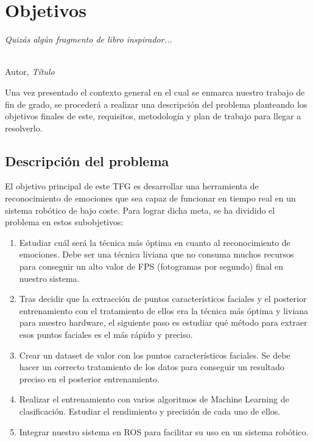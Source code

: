 \chapter{Objetivos}
\label{cap:capitulo2}

\begin{flushright}
\begin{minipage}[]{10cm}
\emph{Quizás algún fragmento de libro inspirador...}\\
\end{minipage}\\

Autor, \textit{Título}\\
\end{flushright}

\vspace{1cm}

Una vez presentado el contexto general en el cual se enmarca nuestro trabajo de fin de grado, se procederá a realizar una descripción del problema planteando los objetivos finales de este, requisitos, metodología y plan de trabajo para llegar a resolverlo.

\section{Descripción del problema}
\label{sec:descripcion}

El objetivo principal de este TFG es desarrollar una herramienta de reconocimiento de emociones que sea capaz de funcionar en tiempo real en un sistema robótico de bajo coste. Para lograr dicha meta, se ha dividido el problema en estos subobjetivos:
\begin{enumerate}
    \item Estudiar cuál será la técnica más óptima en cuanto al reconocimiento de emociones. Debe ser una técnica liviana que no consuma muchos recursos para conseguir un alto valor de FPS (fotogramas por segundo) final en nuestro sistema.
    
    \item Tras decidir que la extracción de puntos característicos faciales y el posterior entrenamiento con el tratamiento de ellos era la técnica más óptima y liviana para nuestro hardware, el siguiente paso es estudiar qué método para extraer esos puntos faciales es el más rápido y preciso.
    
    \item Crear un dataset de valor con los puntos característicos faciales. Se debe hacer un correcto tratamiento de los datos para conseguir un resultado preciso en el posterior entrenamiento.
    
    \item Realizar el entrenamiento con varios algoritmos de Machine Learning de clasificación. Estudiar el rendimiento y precisión de cada uno de ellos.
    
    \item Integrar nuestro sistema en ROS para facilitar su uso en un sistema robótico.
\end{enumerate}


